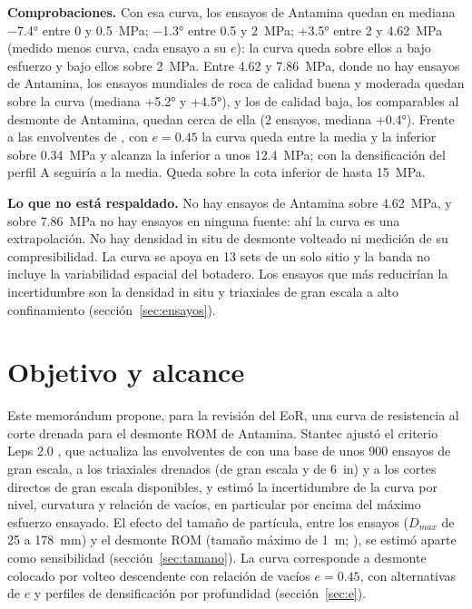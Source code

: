 \documentclass[11pt,letterpaper]{article}
\begin{document}
\textbf{Comprobaciones.} Con esa curva, los ensayos de Antamina quedan en mediana $-$7.4° entre 0 y 0.5~MPa; $-$1.3° entre 0.5 y 2~MPa; +3.5° entre 2 y 4.62~MPa (medido menos curva, cada ensayo a su $e$): la curva queda sobre ellos a bajo esfuerzo y bajo ellos sobre 2~MPa. Entre 4.62 y 7.86~MPa, donde no hay ensayos de Antamina, los ensayos mundiales de roca de calidad buena y moderada quedan sobre la curva (mediana +5.2° y +4.5°), y los de calidad baja, los comparables al desmonte de Antamina, quedan cerca de ella (2 ensayos, mediana +0.4°). Frente a las envolventes de \citet{leps}, con $e = 0.45$ la curva queda entre la media y la inferior sobre 0.34~MPa y alcanza la inferior a unos 12.4~MPa; con la densificación del perfil A seguiría a la media. Queda sobre la cota inferior de \citet{indraratna1993} hasta 15~MPa.

\textbf{Lo que no está respaldado.} No hay ensayos de Antamina sobre 4.62~MPa, y sobre 7.86~MPa no hay ensayos en ninguna fuente: ahí la curva es una extrapolación. No hay densidad in situ de desmonte volteado ni medición de su compresibilidad. La curva se apoya en 13 sets de un solo sitio y la banda no incluye la variabilidad espacial del botadero. Los ensayos que más reducirían la incertidumbre son la densidad in situ y triaxiales de gran escala a alto confinamiento (sección~\ref{sec:ensayos}).

\section{Objetivo y alcance}\label{sec:obj}
Este memorándum propone, para la revisión del EoR, una curva de resistencia al corte drenada para el desmonte ROM de Antamina. Stantec ajustó el criterio Leps 2.0 \citep{cylwik}, que actualiza las envolventes de \citet{leps} con una base de unos 900 ensayos de gran escala, a los triaxiales drenados (de gran escala y de 6~in) y a los cortes directos de gran escala disponibles, y estimó la incertidumbre de la curva por nivel, curvatura y relación de vacíos, en particular por encima del máximo esfuerzo ensayado. El efecto del tamaño de partícula, entre los ensayos ($D_{max}$ de 25 a 178~mm) y el desmonte ROM (tamaño máximo de 1~m; \citealp[Tabla~3-1]{stantec2026iff}), se estimó aparte como sensibilidad (sección~\ref{sec:tamano}). La curva corresponde a desmonte colocado por volteo descendente con relación de vacíos $e = 0.45$, con alternativas de $e$ y perfiles de densificación por profundidad (sección~\ref{sec:e}).
\end{document}
